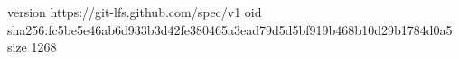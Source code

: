 version https://git-lfs.github.com/spec/v1
oid sha256:fc5be5e46ab6d933b3d42fe380465a3ead79d5d5bf919b468b10d29b1784d0a5
size 1268
